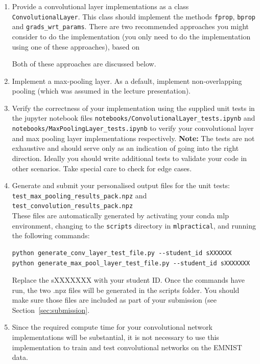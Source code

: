 \documentclass[11pt,]{article}
\begin{document}
\begin{enumerate}
  \item Provide a convolutional layer implementations as a class \texttt{ConvolutionalLayer}.  This class should implement the methods \texttt{fprop}, \texttt{bprop} and \texttt{grads\_wrt\_params}.  There are two recommended approaches you might consider to do the implementation (you only need to do the implementation using one of these approaches), based on
  Both of these approaches are discussed below.
  
  \item Implement a max-pooling layer. As a default, implement non-overlapping pooling (which was assumed in the lecture presentation). 
 
  \item  Verify the correctness of your implementation using the supplied unit tests in the jupyter notebook files \texttt{notebooks/ConvolutionalLayer\_tests.ipynb} and
\texttt{notebooks/MaxPoolingLayer\_tests.ipynb} to verify your convolutional layer and max pooling layer implementations respectively. \textbf{Note:} The tests are not exhaustive and should serve only as an indication of going into the right direction. Ideally you should write additional tests to validate your code in other scenarios. Take special care to check for edge cases.

\item Generate and submit your personalised output files for the unit tests:\\ \texttt{test\_max\_pooling\_results\_pack.npz} and \texttt{test\_convolution\_results\_pack.npz}\\
These files are automatically generated by activating your conda mlp environment, changing to the \texttt{scripts} directory in \texttt{mlpractical},  and running the following commands: 
 \begin{verbatim}
python generate_conv_layer_test_file.py --student_id sXXXXXX
python generate_max_pool_layer_test_file.py --student_id sXXXXXXX
\end{verbatim}
Replace the sXXXXXXX with your student ID. Once the commands have run, the two .npz files will be generated in the scripts folder. You should make sure those files are included as part of your submission (see Section~\ref{sec:submission}.
  

\item Since the required compute time for your convolutional network implementations will be substantial, it is not necessary to use this implementation to train and test convolutional networks on the EMNIST data.
\end{enumerate}
\end{document}
